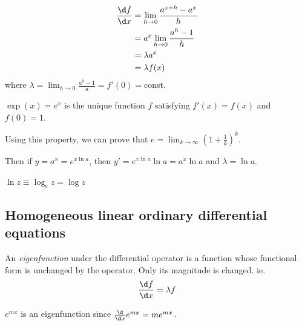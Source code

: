 \documentclass[a4paper]{article}
\begin{document}
  \begin{center}
  \end{center}

  \begin{align*}
    \frac{\d f}{\d x} &= \lim_{h\to 0}\frac{a^{x+h}-a^x}{h}\\
    &= a^x\lim_{h\to 0}\frac{a^h-1}{h}\\
    &= \lambda a^x\\
    &= \lambda f(x)
  \end{align*}
  where $\displaystyle \lambda = \lim_{h\to 0}\frac{a^h-1}{a} = f'(0) = $const.

  \begin{defi}
    $\exp(x) = e^x$ is the unique function $f$ satisfying $f'(x) = f(x)$ and $f(0) = 1$.
  \end{defi}

  Using this property, we can prove that $\displaystyle e=\lim_{k\to \infty} \left(1 + \frac{1}{k}\right)^k$. 

  Then if $y = a^x = e^{x\ln a}$, then $y' = e^{x\ln a}\ln a = a^x\ln a$ and $\lambda = \ln a$. 

  \begin{notation}
    $\ln z \equiv \log_e z = \log z$
  \end{notation}

  \subsection{Homogeneous linear ordinary differential equations}
  \begin{defi}[Eigenfunction]
    An \emph{eigenfunction} under the differential operator is a function whose functional form is unchanged by the operator. Only its magnitude is changed. ie.
    \[
      \frac{\d f}{\d x} = \lambda f
    \]
  \end{defi}
  \begin{eg}
    $e^{mx}$ is an eigenfunction since $\frac{\d }{\d x}e^{mx} = me^{mx}$.
  \end{eg}
\end{document}
